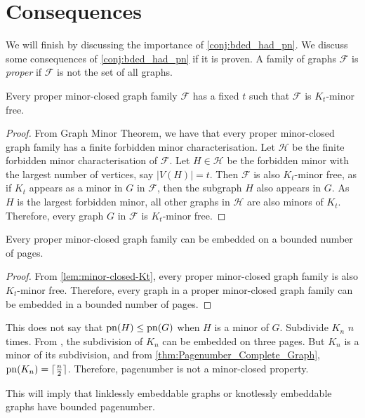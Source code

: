 \section{Consequences}
We will finish by discussing the importance of \cref{conj:bded_had_pn}. We discuss some consequences of \cref{conj:bded_had_pn} if it is proven. 
A family of graphs $\mathcal{F}$ is \textit{proper} if $\mathcal{F}$ is not the set of all graphs. 

\begin{lemma}\label{lem:minor-closed-Kt}
    Every proper minor-closed graph family $\mathcal{F}$ has a fixed $t$ such that $\mathcal{F}$ is $K_t$-minor free. 
\end{lemma}

\begin{proof}
    From \textcite{robertsonGraphMinorsXX2004} Graph Minor Theorem, we have that every proper minor-closed graph family has a finite forbidden minor characterisation. Let $\mathcal{H}$ be the finite forbidden minor characterisation of $\mathcal{F}$. Let $H \in \mathcal{H}$ be the forbidden minor with the largest number of vertices, say $|V(H)| = t$. Then $\mathcal{F}$ is also $K_t$-minor free, as if $K_t$ appears as a minor in $G$ in $\mathcal{F}$, then the subgraph $H$ also appears in $G$. As $H$ is the largest forbidden minor, all other graphs in $\mathcal{H}$ are also minors of $K_t$. Therefore, every graph $G$ in $\mathcal{F}$ is $K_t$-minor free.
\end{proof}

\begin{lemma}\label{lem:Minor-Closed_Pagenumber}
    Every proper minor-closed graph family can be embedded on a bounded number of pages.
\end{lemma}
\begin{proof}
    From \cref{lem:minor-closed-Kt}, every proper minor-closed graph family is also $K_t$-minor free. Therefore, every graph in a proper minor-closed graph family can be embedded in a bounded number of pages.
\end{proof}

This does not say that $\operatorname{pn}(H) \leq \operatorname{pn}(G)$ when $H$ is a minor of $G$. Subdivide $K_n$ $n$ times. From \textcite{atneosenEmbeddabilityCompactaNbooks}, the subdivision of $K_n$ can be embedded on three pages. But $K_n$ is a minor of its subdivision, and from \cref{thm:Pagenumber_Complete_Graph}, $\operatorname{pn}(K_n) = \lceil \frac{n}{2} \rceil$. Therefore, pagenumber is not a minor-closed property. 

This will imply that linklessly embeddable graphs or knotlessly embeddable graphs have bounded pagenumber. 

